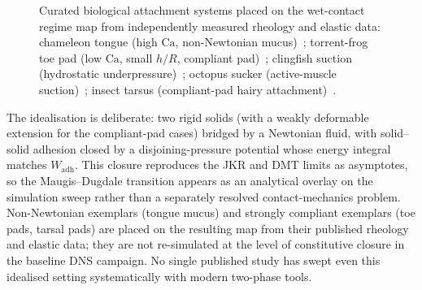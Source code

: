 \documentclass[11pt]{article}
\begin{document}
\begin{figure}[H]
    \begin{center}
        \caption{Curated biological attachment systems placed on the wet-contact regime map from independently measured rheology and elastic data: chameleon tongue (high $\mathrm{Ca}$, non-Newtonian mucus)~\citep{brauChameleonTongue2016}; torrent-frog toe pad (low $\mathrm{Ca}$, small $h/R$, compliant pad)~\citep{barnesTreeFrogToePads2007,drotlefRockFrogToePad2015}; clingfish suction (hydrostatic underpressure)~\citep{wainwrightClingfishSuction2013}; octopus sucker (active-muscle suction)~\citep{smithOctopusSucker1991}; insect tarsus (compliant-pad hairy attachment)~\citep{dirksFederleInsectAdhesion2011,federleAdhesivePadsHairy2006}.}
        \label{fig:biology-montage}
    \end{center}
\end{figure}

The idealisation is deliberate: two rigid solids (with a weakly deformable extension for the compliant-pad cases) bridged by a Newtonian fluid, with solid--solid adhesion closed by a disjoining-pressure potential whose energy integral matches $W_{\mathrm{adh}}$. This closure reproduces the JKR and DMT limits as asymptotes, so the Maugis--Dugdale transition appears as an analytical overlay on the simulation sweep rather than a separately resolved contact-mechanics problem. Non-Newtonian exemplars (tongue mucus) and strongly compliant exemplars (toe pads, tarsal pads) are placed on the resulting map from their published rheology and elastic data; they are not re-simulated at the level of constitutive closure in the baseline DNS campaign. No single published study has swept even this idealised setting systematically with modern two-phase tools.
\end{document}
